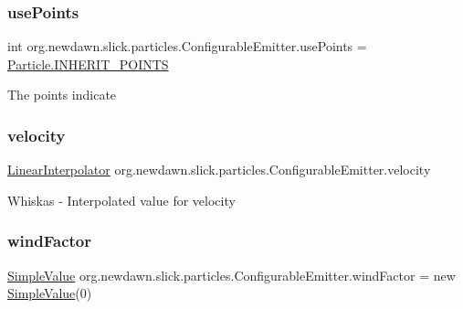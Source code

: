 \subsubsection{\texorpdfstring{use\+Points}{usePoints}}
{\footnotesize\ttfamily int org.\+newdawn.\+slick.\+particles.\+Configurable\+Emitter.\+use\+Points = \mbox{\hyperlink{classorg_1_1newdawn_1_1slick_1_1particles_1_1_particle_a6ecc8039f2f03eab74b6b22ce786d176}{Particle.\+I\+N\+H\+E\+R\+I\+T\+\_\+\+P\+O\+I\+N\+TS}}}

The points indicate \mbox{\label{classorg_1_1newdawn_1_1slick_1_1particles_1_1_configurable_emitter_a5d72439294c47104915106a1395010f8}} 
\subsubsection{\texorpdfstring{velocity}{velocity}}
{\footnotesize\ttfamily \mbox{\hyperlink{classorg_1_1newdawn_1_1slick_1_1particles_1_1_configurable_emitter_1_1_linear_interpolator}{Linear\+Interpolator}} org.\+newdawn.\+slick.\+particles.\+Configurable\+Emitter.\+velocity}

Whiskas -\/ Interpolated value for velocity \mbox{\label{classorg_1_1newdawn_1_1slick_1_1particles_1_1_configurable_emitter_a0b2b2fcff95db03cf39c1ad5911b5176}} 
\subsubsection{\texorpdfstring{wind\+Factor}{windFactor}}
{\footnotesize\ttfamily \mbox{\hyperlink{classorg_1_1newdawn_1_1slick_1_1particles_1_1_configurable_emitter_1_1_simple_value}{Simple\+Value}} org.\+newdawn.\+slick.\+particles.\+Configurable\+Emitter.\+wind\+Factor = new \mbox{\hyperlink{classorg_1_1newdawn_1_1slick_1_1particles_1_1_configurable_emitter_1_1_simple_value}{Simple\+Value}}(0)}

